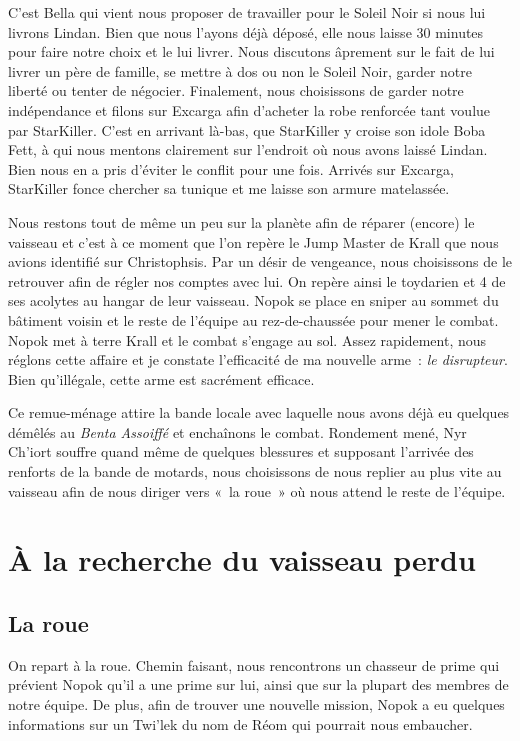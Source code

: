 \documentclass[a4paper,9pt,twoside,twocolumn,openany]{book}
\begin{document}
C’est Bella qui vient nous proposer de travailler pour le Soleil Noir si nous lui livrons Lindan. Bien que nous l’ayons déjà déposé, elle nous laisse 30 minutes pour faire notre choix et le lui livrer. Nous discutons âprement sur le fait de lui livrer un père de famille, se mettre à dos ou non le Soleil Noir, garder notre liberté ou tenter de négocier. Finalement, nous choisissons de garder notre indépendance et filons sur Excarga afin d’acheter la robe renforcée tant voulue par StarKiller. C’est en arrivant là-bas, que StarKiller y croise son idole Boba Fett, à qui nous mentons clairement sur l'endroit où nous avons laissé Lindan. Bien nous en a pris d'éviter le conflit pour une fois. Arrivés sur Excarga, StarKiller fonce chercher sa tunique et me laisse son armure matelassée.

Nous restons tout de même un peu sur la planète afin de réparer (encore) le vaisseau et c’est à ce moment que l’on repère le Jump Master de Krall que nous avions identifié sur Christophsis. Par un désir de vengeance, nous choisissons de le retrouver afin de régler nos comptes avec lui.
On repère ainsi le toydarien et 4 de ses acolytes au hangar de leur vaisseau. Nopok se place en sniper au sommet du bâtiment voisin et le reste de l'équipe au rez-de-chaussée pour mener le combat. Nopok met à terre Krall et le combat s'engage au sol. Assez rapidement, nous réglons cette affaire et je constate l'efficacité de ma nouvelle arme\ : \emph{le disrupteur}. Bien qu’illégale, cette arme est sacrément efficace.

Ce remue-ménage attire la bande locale avec laquelle nous avons déjà eu quelques démêlés au \emph{Benta Assoiffé} et enchaînons le combat. Rondement mené, Nyr Ch'iort souffre quand même de quelques blessures et supposant l’arrivée des renforts de la bande de motards, nous choisissons de nous replier au plus vite au vaisseau afin de nous diriger vers «\ la roue\ » où nous attend le reste de l’équipe.

\chapter{À la recherche du vaisseau perdu}

\section{La roue}
\subtitle{10 juin 2016}

On repart à la roue. Chemin faisant, nous rencontrons un chasseur de prime qui prévient Nopok qu’il a une prime sur lui, ainsi que sur la plupart des membres de notre équipe. De plus, afin de trouver une nouvelle mission, Nopok a eu quelques informations sur un Twi'lek du nom de Réom qui pourrait nous embaucher.
\end{document}
